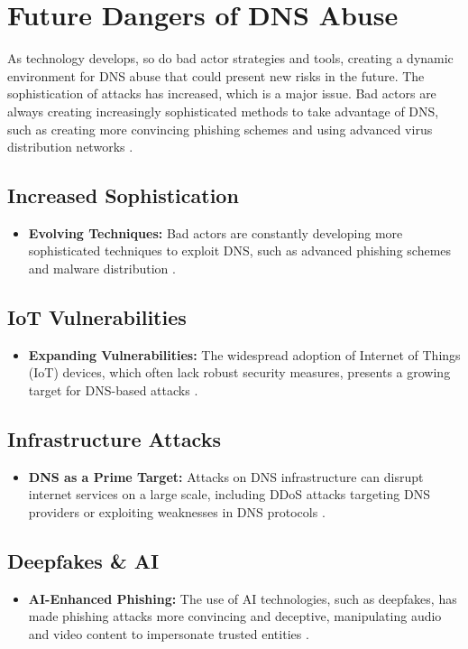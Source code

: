 \section{Future Dangers of DNS Abuse}

As technology develops, so do bad actor strategies and tools, creating a dynamic environment for DNS abuse that could present new risks in the future. The sophistication of attacks has increased, which is a major issue. Bad actors are always creating increasingly sophisticated methods to take advantage of DNS, such as creating more convincing phishing schemes and using advanced virus distribution networks \cite{icann2022dnsabusetrends}.

\subsection{Increased Sophistication}
\begin{itemize}
    \item \textbf{Evolving Techniques:} Bad actors are constantly developing more sophisticated techniques to exploit DNS, such as advanced phishing schemes and malware distribution \cite{wrightson2014advanced}.
\end{itemize}

\subsection{IoT Vulnerabilities}
\begin{itemize}
    \item \textbf{Expanding Vulnerabilities:} The widespread adoption of Internet of Things (IoT) devices, which often lack robust security measures, presents a growing target for DNS-based attacks \cite{mahmoud2015internet}.
\end{itemize}

\subsection{Infrastructure Attacks}
\begin{itemize}
    \item \textbf{DNS as a Prime Target:} Attacks on DNS infrastructure can disrupt internet services on a large scale, including DDoS attacks targeting DNS providers or exploiting weaknesses in DNS protocols \cite{dooley2017dns}.
\end{itemize}

\subsection{Deepfakes \& AI}
\begin{itemize}
    \item \textbf{AI-Enhanced Phishing:} The use of AI technologies, such as deepfakes, has made phishing attacks more convincing and deceptive, manipulating audio and video content to impersonate trusted entities \cite{schick2020deep}.
\end{itemize}

